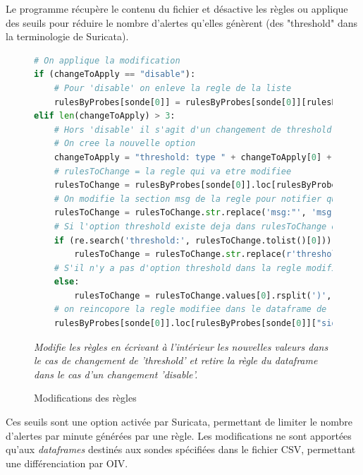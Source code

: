 \newpage

Le programme récupère le contenu du fichier et désactive les règles ou applique des seuils pour réduire le nombre d'alertes qu'elles génèrent (des "threshold" dans la terminologie de Suricata).\\

\begin{figure}[h]%
    \center%
\begin{lstlisting}[language=Python]
# On applique la modification
if (changeToApply == "disable"):
    # Pour 'disable' on enleve la regle de la liste
    rulesByProbes[sonde[0]] = rulesByProbes[sonde[0]][rulesByProbes[sonde[0]]["sid"] != targetSid]
elif len(changeToApply) > 3:
    # Hors 'disable' il s'agit d'un changement de threshold
    # On cree la nouvelle option
    changeToApply = "threshold: type " + changeToApply[0] + ", track " + changeToApply[1] + ", seconds " + changeToApply[3] + ", count " + changeToApply[2] + ";"
    # rulesToChange = la regle qui va etre modifiee
    rulesToChange = rulesByProbes[sonde[0]].loc[rulesByProbes[sonde[0]]["sid"] == targetSid, 'rules']
    # On modifie la section msg de la regle pour notifier qu'elle a ete modifiee
    rulesToChange = rulesToChange.str.replace('msg:"', 'msg:"AMSN_RULE ')
    # Si l'option threshold existe deja dans rulesToChange on la remplace par la nouvelle
    if (re.search('threshold:', rulesToChange.tolist()[0])):
        rulesToChange = rulesToChange.str.replace(r'threshold:(.*?);', changeToApply, regex=True)
    # S'il n'y a pas d'option threshold dans la regle modifiee on place la nouvelle option a la fin 
    else:
        rulesToChange = rulesToChange.values[0].rsplit(')', 1)[0] + changeToApply + ')\n'
    # on reincopore la regle modifiee dans le dataframe de la sonde selectionnee
    rulesByProbes[sonde[0]].loc[rulesByProbes[sonde[0]]["sid"] == targetSid, 'rules'] = rulesToChange
\end{lstlisting}
{\small
    \textit{Modifie les règles en écrivant à l'intérieur les nouvelles valeurs dans le cas de changement de 'threshold' et retire la règle du dataframe dans le cas d'un changement 'disable'.}
    }
\caption[Modifications des règles]{Modifications des règles}\label{fig:ModifRules}
\end{figure}

\vspace{1em}

Ces seuils sont une option activée par Suricata, permettant de limiter le nombre d'alertes par minute générées par une règle. Les modifications ne sont apportées qu'aux \textit{dataframes} destinés aux sondes spécifiées dans le fichier CSV, permettant une différenciation par OIV.

